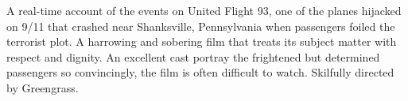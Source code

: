 \iffalse
\movie{Umbrellas of Cherbourg, The}{1964}{91m}{\threehalf} \dir{Jacques Demy} \cast{Catherine Deneuve; Nino Castelnuovo; Anne Vernon; Marc Michel; Ellen Farner} \author{AW}
\fi

\iffalse
\movie{Unforgiven}{1992}{131m}{\threehalf} \dir{Clint Eastwood}
\fi

   A real-time account of the events on United Flight 93, one of the planes hijacked on 9/11 that crashed near Shanksville, Pennsylvania when passengers foiled the terrorist plot. A harrowing and sobering film that treats its subject matter with respect and dignity. An excellent cast portray the frightened but determined passengers so convincingly, the film is often difficult to watch. Skilfully directed by Greengrass. \author{DW} 

